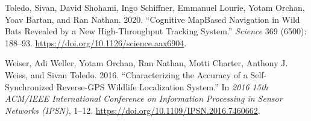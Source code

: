 \documentclass[]{scrreprt}
\begin{document}
\leavevmode\hypertarget{ref-toledo2020}{}%
Toledo, Sivan, David Shohami, Ingo Schiffner, Emmanuel Lourie, Yotam Orchan, Yoav Bartan, and Ran Nathan. 2020. ``Cognitive MapBased Navigation in Wild Bats Revealed by a New High-Throughput Tracking System.'' \emph{Science} 369 (6500): 188--93. \url{https://doi.org/10.1126/science.aax6904}.

\leavevmode\hypertarget{ref-weiser2016}{}%
Weiser, Adi Weller, Yotam Orchan, Ran Nathan, Motti Charter, Anthony J. Weiss, and Sivan Toledo. 2016. ``Characterizing the Accuracy of a Self-Synchronized Reverse-GPS Wildlife Localization System.'' In \emph{2016 15th ACM/IEEE International Conference on Information Processing in Sensor Networks (IPSN)}, 1--12. \url{https://doi.org/10.1109/IPSN.2016.7460662}.
\end{document}
